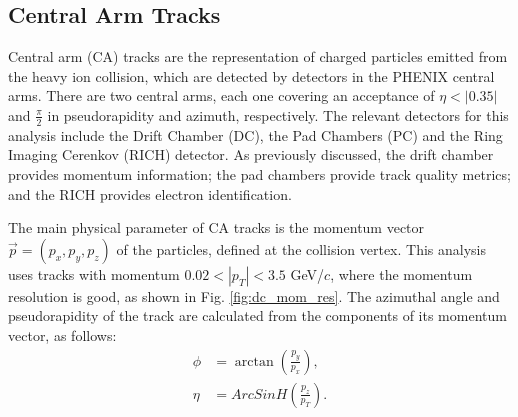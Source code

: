 \subsection{Central Arm Tracks}
Central arm (CA) tracks are the representation of charged particles emitted from the heavy ion collision, which are detected by detectors in the PHENIX central arms. There are two central arms, each one covering an acceptance of $\eta < |0.35|$ and $\frac{\pi}{2}$ in pseudorapidity and azimuth, respectively. The relevant detectors for this analysis include the Drift Chamber (DC), the Pad Chambers (PC) and the Ring Imaging Cerenkov (RICH) detector. As previously discussed, the drift chamber provides momentum information; the pad chambers provide track quality metrics; and the RICH provides electron identification. 

The main physical parameter of CA tracks is the momentum vector $\vec{p} = (p_x, p_y, p_z)$ of the particles, defined at the collision vertex. This analysis uses tracks with momentum $0.02 < |p_T| < 3.5$ GeV/$c$, where the momentum resolution is good, as shown in Fig. \ref{fig:dc_mom_res}. The azimuthal angle and pseudorapidity of the track are calculated from the components of its momentum vector, as follows: 
\begin{align}
\phi &= \arctan( \frac{p_y}{p_x} ),\\
\eta &= ArcSinH(\frac{p_z}{p_T}). 
\label{eqn:phi_eta_form}
\end{align}

